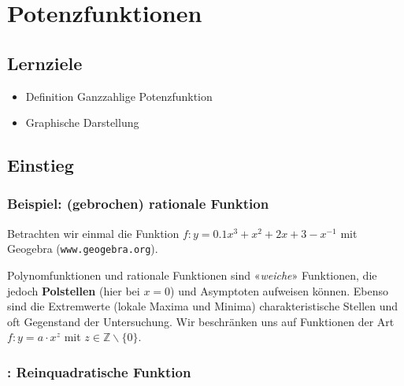 \section{Potenzfunktionen}

\subsection*{Lernziele}

\begin{itemize}
\item Definition Ganzzahlige Potenzfunktion
\item Graphische Darstellung
\end{itemize}
\newpage


\subsection{Einstieg}

\subsubsection{Beispiel: (gebrochen) rationale Funktion}

Betrachten wir einmal die Funktion $f: y = 0.1x^3 + x^2 + 2x + 3 - x^{-1}$ \zB mit Geogebra (\texttt{www.geogebra.org}).



Polynomfunktionen und rationale Funktionen sind «\textit{weiche}» Funktionen, die jedoch \textbf{Polstellen} (hier bei $x=0$) und Asymptoten aufweisen können.
Ebenso sind die Extremwerte (lokale Maxima und Minima) charakteristische Stellen und oft Gegenstand der Untersuchung.
Wir beschränken uns auf Funktionen der Art $f: y=a\cdot{}x^z$
mit $z \in \mathbb{Z}\backslash\{0\}$.

\newpage
\subsubsection{: Reinquadratische Funktion}

